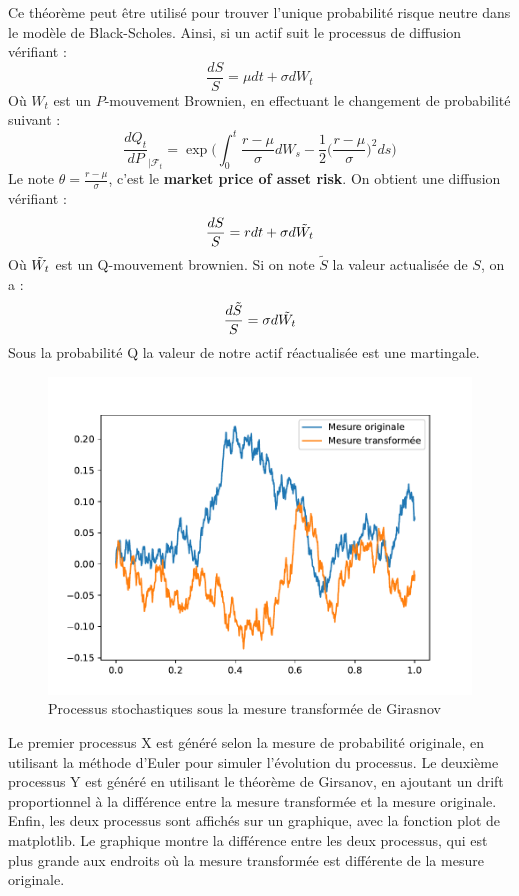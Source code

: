 \documentclass[a4paper]{article}
\begin{document}
\vspace{2mm} 
Ce théorème peut être utilisé pour trouver l'unique probabilité risque neutre dans le modèle de Black-Scholes. Ainsi, si un actif suit le processus de diffusion vérifiant : 
\begin{equation}
    \frac{dS}{S} = \mu dt + \sigma dW_t
\end{equation}
Où $W_t$ est un $P$-mouvement Brownien, en effectuant le changement de probabilité suivant : 
\begin{equation}
    \frac{dQ_t}{dP}_{|\mathcal{F}_t} = \exp{ \bigg(  \int_{0}^{t} \frac{r-\mu}{\sigma}dW_s -\frac{1}{2}\bigg( \frac{r-\mu}{\sigma}\bigg)^2 ds\bigg)}
\end{equation}
Le note $\theta = \frac{r-\mu}{\sigma}$, c'est le \textbf{market price of asset risk}.
On obtient une diffusion vérifiant :
\begin{equation}
    \frac{dS}{S} = r dt + \sigma d \Tilde{W_t}
\end{equation}
Où $\Tilde{W_t}$ est un Q-mouvement brownien. Si on note $\tilde{S}$ la valeur actualisée de $S$, on a :
\begin{equation}
    \frac{d\Tilde{S}}{S} = \sigma d \Tilde{W_t}
\end{equation}
Sous la probabilité Q la valeur de notre actif réactualisée est une martingale.
\begin{figure}[H]
\centering
    \includegraphics[scale=0.6]{figures/girsqnov.pdf}
    \caption{Processus stochastiques sous la mesure transformée de Girasnov}
    \label{fig:my_label}
\end{figure} 
Le premier processus X est généré selon la mesure de probabilité originale, en utilisant la méthode d'Euler pour simuler l'évolution du processus.
Le deuxième processus Y est généré en utilisant le théorème de Girsanov, en ajoutant un drift proportionnel à la différence entre la mesure transformée et la mesure originale.
Enfin, les deux processus sont affichés sur un graphique, avec la fonction plot de matplotlib. Le graphique montre la différence entre les deux processus, qui est plus grande aux endroits où la mesure transformée est différente de la mesure originale. 
\end{document}
